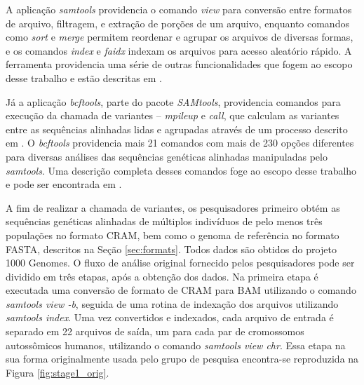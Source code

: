 \documentclass[cic,tc]{iiufrgs}
\begin{document}
A aplicação \textit{samtools} providencia o comando \textit{view} para conversão entre
formatos de arquivo, filtragem, e extração de porções de um arquivo, enquanto
comandos como \textit{sort} e \textit{merge} permitem reordenar e agrupar os
arquivos de diversas formas, e os comandos \textit{index} e \textit{faidx}
indexam os arquivos para acesso aleatório rápido. A ferramenta providencia uma
série de outras funcionalidades que fogem ao escopo desse trabalho e estão
descritas em \cite{danecek2021twelve}.

Já a aplicação \textit{bcftools}, parte do pacote \textit{SAMtools}, providencia comandos para
execução da chamada de variantes -- \textit{mpileup} e \textit{call}, que
calculam as variantes entre as sequências alinhadas lidas e agrupadas através
de um processo descrito em \cite{li2011improving}. O \textit{bcftools} providencia mais
21 comandos com mais de 230 opções diferentes para diversas análises das
sequências genéticas alinhadas manipuladas pelo \textit{samtools}. Uma descrição
completa desses comandos foge ao escopo desse trabalho e pode ser encontrada em
\cite{danecek2021twelve}.

A fim de realizar a chamada de variantes, os pesquisadores primeiro obtém as
sequências genéticas alinhadas de múltiplos indivíduos de pelo menos três
populações no formato CRAM, bem como o genoma de referência no formato FASTA,
descritos na Seção \ref{sec:formats}. Todos dados são obtidos do projeto 1000
Genomes. O fluxo de análise original fornecido pelos pesquisadores pode ser
dividido em três etapas, após a obtenção dos dados. Na primeira etapa é
executada uma conversão de formato de CRAM para BAM utilizando o comando
\textit{samtools view -b}, seguida de uma rotina de indexação dos arquivos
utilizando \textit{samtools index}. Uma vez convertidos e indexados, cada
arquivo de entrada é separado em 22 arquivos de saída, um para cada par de
cromossomos autossômicos humanos, utilizando o comando \textit{samtools view
chr}. Essa etapa na sua forma originalmente usada pelo grupo de pesquisa
encontra-se reproduzida na Figura \ref{fig:stage1_orig}.
\end{document}
